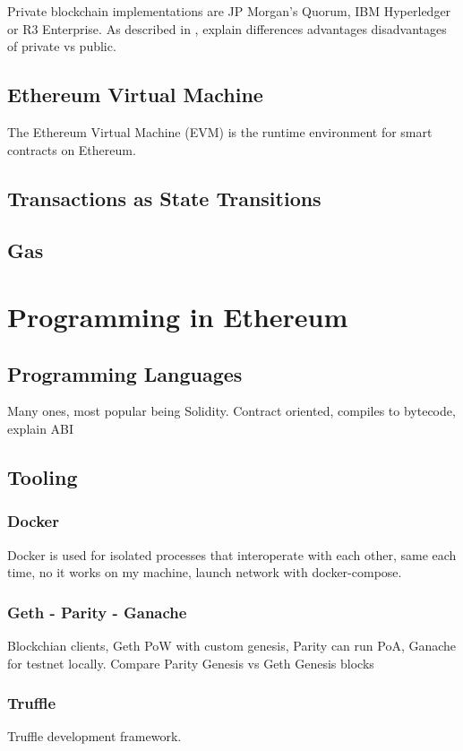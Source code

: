 Private blockchain implementations are JP Morgan's Quorum, IBM Hyperledger or R3 Enterprise. As described in \cite{publicprivate}, explain differences advantages disadvantages of private vs public.

\subsection{Ethereum Virtual Machine}
The Ethereum Virtual Machine (EVM) is the runtime environment for smart contracts on Ethereum. 

\subsection{Transactions as State Transitions}

\subsection{Gas}

\section{Programming in Ethereum}
\subsection{Programming Languages}
Many ones, most popular being Solidity. 
Contract oriented, compiles to bytecode, explain ABI 

\subsection{Tooling}
\subsubsection{Docker}
Docker is used for isolated processes that interoperate with each other, same each time, no it works on my machine, launch network with docker-compose.
\subsubsection{Geth - Parity - Ganache}
Blockchian clients, Geth PoW with custom genesis, Parity can run PoA, Ganache for testnet locally. Compare Parity Genesis vs Geth Genesis blocks
\subsubsection{Truffle}
Truffle development framework. 